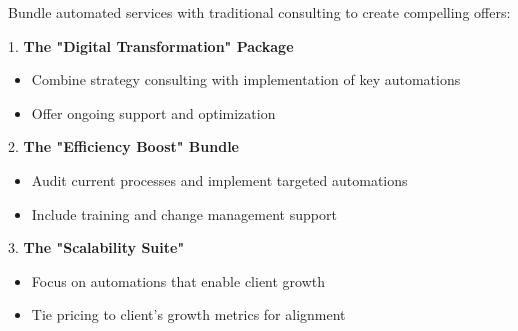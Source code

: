 Bundle automated services with traditional consulting to create compelling offers:

1. \textbf{The "Digital Transformation" Package}
\begin{itemize}
    \item Combine strategy consulting with implementation of key automations
    \item Offer ongoing support and optimization
\end{itemize}

2. \textbf{The "Efficiency Boost" Bundle}
\begin{itemize}
    \item Audit current processes and implement targeted automations
    \item Include training and change management support
\end{itemize}

3. \textbf{The "Scalability Suite"}
\begin{itemize}
    \item Focus on automations that enable client growth
    \item Tie pricing to client's growth metrics for alignment
\end{itemize}

